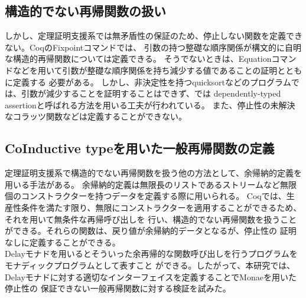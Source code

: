 \documentclass[japanese]{jssst_ppl}
\theoremstyle{definition}
\begin{document}
\subsection{構造的でない再帰関数の扱い}
しかし、定理証明支援系では無矛盾性の保証のため、停止しない関数を定義できない。CoqのFixpointコマンドでは、
引数の持つ整礎な順序関係が構文的に自明な構造的再帰関数については定義できる。%
そうでないときは、Equationコマンドなどを用いて引数が整礎な順序関係を持ち減少する値であることの証明とともに定義する
必要がある。
しかし、非決定性を持つquicksortなどのプログラムでは、引数が減少することを証明することはできず、\cite{monae}では
dependently-typed assertionと呼ばれる方法を用いる工夫が行われている。
また、停止性の未解決なコラッツ関数などは定義することができない。

\subsection{CoInductive typeを用いた一般再帰関数の定義}
定理証明支援系で構造的でない再帰関数を扱う他の方法として、余帰納的定義を用いる手法がある。
余帰納的定義は無限長のリストであるストリームなど無限個のコンストラクターを持つデータを定義する際に用いられる。
Coqでは、生産性条件を満たす限り、無限にコンストラクターを適用することができるため、それを用いて無条件な再帰呼び出しを
行い、構造的でない再帰関数を扱うことができる。それらの関数は、戻り値が余帰納的データとなるが、停止性の
証明なしに定義することができる。\\
Delayモナド\cite{lmcs:2265}を用いるとそういった余再帰的な関数呼び出しを行うプログラムをモナディックプログラムとして表すこと
ができる。したがって、本研究では、Delayモナドに対する適切なインターフェイスを定義することでMonaeを用いた停止性の
保証できない一般再帰関数に対する検証を試みた。






\end{document}
